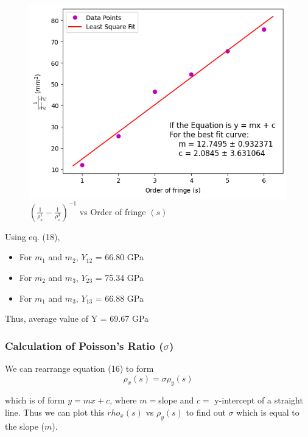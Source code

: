     \begin{figure}[H]
        \centering
        \label{graph:3}
        \includegraphics[width=0.8\columnwidth]{images/3.png}
        \caption{$(\frac{1}{\rho_{x}^1}-\frac{1}{\rho_{x}^3})^{-1}$ vs Order of fringe $(s)$}
    \end{figure}

    Using eq. (18),
   \begin{itemize}
       \item For $m_1$ and $m_2$, $Y_{12}$ = 66.80 GPa
       \item For $m_2$ and $m_3$, $Y_{23}$ = 75.34 GPa
       \item For $m_1$ and $m_3$, $Y_{13}$ = 66.88 GPa
   \end{itemize}

   Thus, average value of Y = 69.67 GPa

   \subsubsection{Calculation of Poisson's Ratio ($\sigma$)}

     We can rearrange equation (16) to form 
     \begin{equation}
         \rho_x(s) = \sigma \rho_y(s)
     \end{equation}

      which is of form $y=mx+c$, where $m=$slope and $c=$ y-intercept of a straight line. Thus we can plot this $rho_x(s)$ vs $\rho_y(s)$ to find out $\sigma$ which is equal to the slope ($m$).

